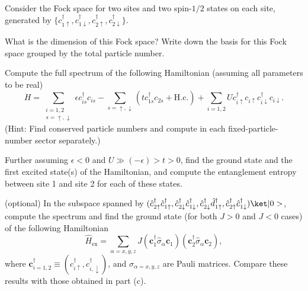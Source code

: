 \clearpage

\begin{problem}
  Consider the Fock space for two sites and two spin-$1/2$ states on each site,
  generated by $\{c_{1\uparrow}^\dagger, c_{1\downarrow}^\dagger,
  c_{2\uparrow}^\dagger, c_{2\downarrow}^\dagger\}$.
  \begin{enumext*}[label = (\alph*)]
    \item What is the dimension of this Fock space? Write down the basis for
    this Fock space grouped by the total particle number.
    \item Compute the full spectrum of the following Hamiltonian (assuming all
    parameters to be real)
    \[
      H = \sum_{\substack{i=1,2\\s=\uparrow,\downarrow}}
          \epsilon c_{is}^\dagger c_{is}
        - \sum_{s=\uparrow,\downarrow}(tc_{1s}^\dagger c_{2s} + \text{H.c.})
        + \sum_{i=1,2} Uc_{i\uparrow}^\dagger c_{i\uparrow}
                        c_{i\downarrow}^\dagger c_{i\downarrow}.
    \]
    (Hint: Find conserved particle numbers and compute in each
    fixed-particle-number sector separately.)
    \item Further assuming $\epsilon < 0$ and $U \gg (-\epsilon) > t > 0$, find
    the ground state and the first excited state(s) of the Hamiltonian, and
    compute the entanglement entropy between site 1 and site 2 for each of
    these states.
    \item* (optional) In the subspace spanned by
    $(\hat c_{2\uparrow}^\dagger   \hat c_{1\uparrow}^\dagger,
      \hat c_{2\downarrow}^\dagger \hat c_{1\downarrow}^\dagger,
      \hat c_{2\downarrow}^\dagger \hat d_{1\uparrow}^\dagger,
      \hat c_{2\uparrow}^\dagger   \hat c_{1\downarrow}^\dagger) \ket|0>$,
    compute the spectrum and find the ground state (for both $J > 0$ and $J < 0$
    cases) of the following Hamiltonian
    \[
      \hat H_\text{ex} = \sum_{\alpha=x,y,z} J
        (\bm c_1^\dagger \hat \sigma_\alpha \bm c_1)
        (\bm c_2^\dagger \hat \sigma_\alpha \bm c_2),
    \]
    where $\bm c_{i=1,2}^\dagger \equiv (c_{i\uparrow}^\dagger,
    c_{i,\downarrow}^\dagger)$, and $\sigma_{\alpha=x,y,z}$ are Pauli matrices.
    Compare these results with those obtained in part (c).
  \end{enumext*}
\end{problem}
